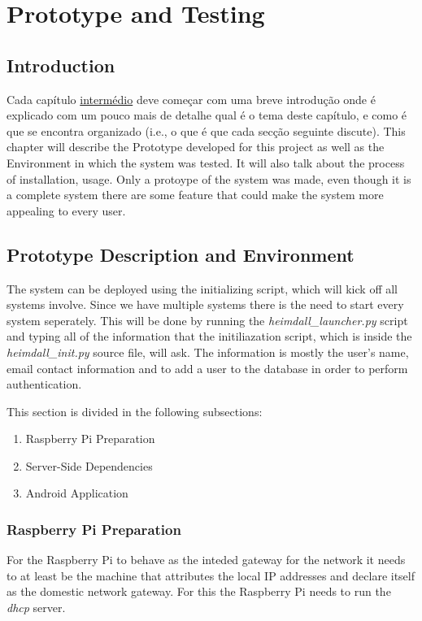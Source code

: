\chapter{Prototype and Testing}
\label{chap:proto-test}

\section{Introduction}
\label{chap4:sec:intro}
Cada capítulo \underline{intermédio} deve começar com uma breve introdução onde é explicado com um pouco mais de detalhe qual é o tema deste capítulo, e como é que se encontra organizado (i.e., o que é que cada secção seguinte discute).
This chapter will describe the Prototype developed for this project as well as
the Environment in which the system was tested. It will also talk about the
process of installation, usage. Only a protoype of the system was made, even
though it is a complete system there are some feature that could make the system
more appealing to every user.

\section{Prototype Description and Environment}
\label{chap4:sec:desc-env}
The system can be deployed using the initializing script, which will kick off
all systems involve. Since we have multiple systems there is the need to start
every system seperately. This will be done by running the
\emph{heimdall\_launcher.py} script and typing all of the information that the
initiliazation script, which is inside the \emph{heimdall\_init.py} source file,
will ask. The information is mostly the user's name, email contact information
and to add a user to the database in order to perform authentication.

This section is divided in the following subsections:
\begin{enumerate}
	\item Raspberry Pi Preparation
	\item Server-Side Dependencies
	\item Android Application
\end{enumerate}

\subsection{Raspberry Pi Preparation}
\label{chap5:sec:inst-usg:sub:rasp-prep}
For the Raspberry Pi to behave as the inteded gateway for the network it needs
to at least be the machine that attributes the local IP addresses and declare
itself as the domestic network gateway. For this the Raspberry Pi needs to run
the \emph{dhcp} server.

